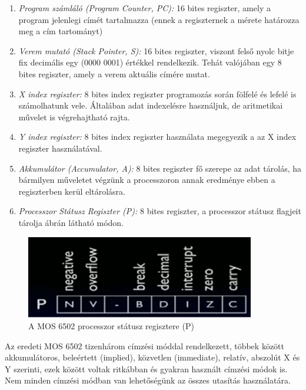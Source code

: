 	\begin{enumerate}
		\item \emph{Program számláló (Program Counter, PC):} 16 bites regiszter, amely a program jelenlegi címét tartalmazza (ennek a regiszternek a mérete határozza meg a cím tartományt)
		\item \emph{Verem mutató (Stack Pointer, S):} 16 bites regiszter, viszont felső nyolc bitje fix decimális egy (0000 0001) értékkel rendelkezik. Tehát valójában egy 8 bites regiszter, amely a verem aktuális címére mutat. 
		\item \emph{X index regiszter:} 8 bites index regiszter programozás során fölfelé és lefelé is számolhatunk vele. Általában adat indexelésre használjuk, de aritmetikai művelet is végrehajtható rajta.
		\item\emph{Y index regiszter:} 8 bites index regiszter használata megegyezik a az X index regiszter használatával. 
		\item \emph{Akkumulátor (Accumulator, A):} 8 bites regiszter fő szerepe az adat tárolás, ha bármilyen műveletet végzünk a processzoron annak eredménye ebben a regiszterben kerül eltárolásra.
		\item \emph{Processzor Státusz Regiszter (P):} 8 bites regiszter, a processzor státusz flagjeit tárolja  ábrán látható módon.	
	\end{enumerate} 
	
	\begin{figure}[H]
		\centering
		\includegraphics[width=100mm, keepaspectratio]{figures/6502-P-reg}
		\caption{A MOS 6502 processzor státusz regisztere (P)}
		\label{fig:6502-P-reg}
	\end{figure} 
	
	Az eredeti MOS 6502 tizenhárom címzési móddal rendelkezett, többek között akkumulátoros, beleértett (implied), közvetlen (immediate), relatív, abszolút X és Y szerinti, ezek között voltak ritkábban és gyakran használt címzési módok is. Nem minden címzési módban van lehetőségünk az összes utasítás használatára.
	
